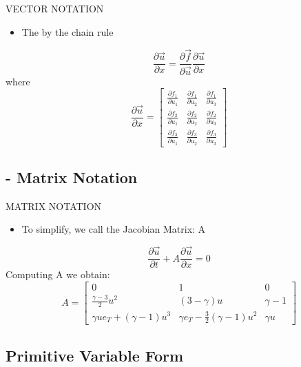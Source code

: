\documentclass{beamer}
\begin{document}
\begin{frame}{VECTOR NOTATION}
  \begin{itemize}
   \item The by the chain rule
  \end{itemize}
  \begin{equation}
   \frac{\partial{\vec{u}}}{\partial{x}}=\frac{\partial\vec{f}}{\partial\vec{u}}\frac{\partial{\vec{u}}}{\partial{x}}
  \end{equation}
  where
  \begin{equation}
    \frac{\partial{\vec{u}}}{\partial{x}}=\begin{bmatrix}
    \frac{\partial{f_1}}{\partial{u_1}} & \frac{\partial{f_1}}{\partial{u_2}} & \frac{\partial{f_1}}{\partial{u_3}}\\ 
    \frac{\partial{f_2}}{\partial{u_1}} & \frac{\partial{f_2}}{\partial{u_2}} & \frac{\partial{f_2}}{\partial{u_3}}\\ 
    \frac{\partial{f_3}}{\partial{u_1}} & \frac{\partial{f_3}}{\partial{u_2}} & \frac{\partial{f_3}}{\partial{u_3}}
    \end{bmatrix}
  \end{equation}
\end{frame}

\subsection{- Matrix Notation} 

\begin{frame}{MATRIX NOTATION}
  \begin{itemize}
   \item To simplify, we call the Jacobian Matrix: A
  \end{itemize}
  \begin{equation}
    \frac{\partial{\vec{u}}}{\partial{t}}+A\frac{\partial{\vec{u}}}{\partial{x}}=0
  \end{equation}
  Computing A we obtain:
  \begin{equation}
   A=\begin{bmatrix}
    0 & 1 & 0\\ 
    \frac{\gamma-3}{2}u^2 & (3-\gamma)u & \gamma-1\\ 
    {\gamma}{u}e_T+(\gamma-1)u^3 & {\gamma}e_T-\frac{3}{2}(\gamma-1)u^2 & {\gamma}u
    \end{bmatrix}
  \end{equation}
\end{frame}

\subsection{Primitive Variable Form}
\end{document}

